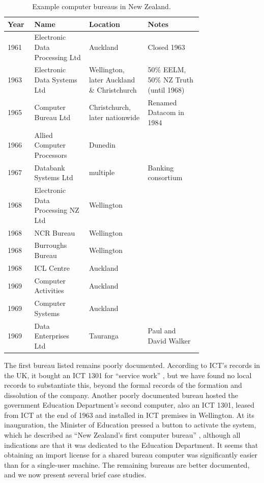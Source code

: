 \documentclass{IEEEcsmag}
\begin{document}
\begin{table}[h]
\begin{center}
\begin{tabular}{ |p{0.07\linewidth}|p{0.23\linewidth}|p{0.23\linewidth}|p{0.23\linewidth}<{\raggedright}| } 
 \hline
 Year & Name & Location & Notes\\ 
\hline
1961 & Electronic Data Processing Ltd & Auckland & Closed 1963\\\hline
1963 & Electronic Data Systems Ltd & Wellington, later Auckland \& Christchurch & 50\% EELM, 50\% NZ Truth (until 1968)\\\hline 
1965 & Computer Bureau Ltd & Christchurch, later nationwide & Renamed Datacom in 1984\\\hline
1966 & Allied Computer Processors & Dunedin & \\\hline
1967 & Databank Systems Ltd & multiple & Banking consortium\\\hline
1968 & Electronic Data Processing NZ Ltd& Wellington&\\\hline
1968 & NCR Bureau & Wellington &\\\hline
1968 & Burroughs Bureau & Wellington &\\\hline
1968 & ICL Centre& Auckland&\\\hline
1969 & Computer Activities& Auckland&\\\hline
1969 & Computer Systems& Auckland&\\\hline
1969 & Data Enterprises Ltd& Tauranga& Paul and David Walker\\\hline
\end{tabular}
\vspace{1ex}
\caption{\label{Bureaux}Example computer bureaus in New Zealand.}
\end{center}
\end{table}
The first bureau listed remains  poorly documented. According to ICT’s records in the UK, it bought an ICT 1301 for “service work”
\cite{ccs-t2x1}, but we have found no local records to substantiate this, beyond the formal records of the formation and dissolution of the company. Another  poorly documented bureau hosted the government Education Department’s second computer, also an ICT 1301, leased from ICT at the end of 1963 and installed in ICT premises in Wellington. At its inauguration, the Minister of Education pressed a button to activate the system, which he described as “New Zealand’s first computer bureau” \cite{NatEd1963},
although all indications are that it was dedicated to the Education Department. It seems that obtaining an import license for a shared bureau computer was significantly easier than for a single-user machine. The remaining bureaus are better documented, and we now present several brief case studies.
\end{document}
